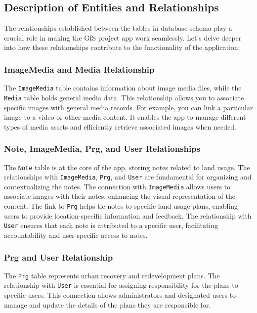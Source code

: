 \subsection{Description of Entities and Relationships}\label{subsec:database-entity-relationship}
The relationships established between the tables in database schema play a crucial role in making the GIS project app work seamlessly. Let's delve deeper into how these relationships contribute to the functionality of the application:

\subsubsection{ImageMedia and Media Relationship}
The \texttt{ImageMedia} table contains information about image media files, while the \texttt{Media} table holds general media data. This relationship allows you to associate specific images with general media records. For example, you can link a particular image to a video or other media content. It enables the app to manage different types of media assets and efficiently retrieve associated images when needed.

\subsubsection{Note, ImageMedia, Prg, and User Relationships}
The \texttt{Note} table is at the core of the app, storing notes related to land usage. The relationships with \texttt{ImageMedia}, \texttt{Prg}, and \texttt{User} are fundamental for organizing and contextualizing the notes. The connection with \texttt{ImageMedia} allows users to associate images with their notes, enhancing the visual representation of the content. The link to \texttt{Prg} helps tie notes to specific land usage plans, enabling users to provide location-specific information and feedback. The relationship with \texttt{User} ensures that each note is attributed to a specific user, facilitating accountability and user-specific access to notes.

\subsubsection{Prg and User Relationship}
The \texttt{Prg} table represents urban recovery and redevelopment plans. The relationship with \texttt{User} is essential for assigning responsibility for the plans to specific users. This connection allows administrators and designated users to manage and update the details of the plans they are responsible for.

